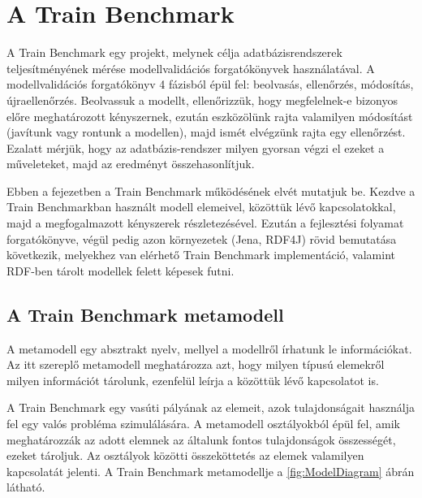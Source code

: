 \chapter{A Train Benchmark}

A Train Benchmark\cite{Szárnyas2017} egy projekt, melynek célja adatbázisrendszerek teljesítményének mérése modellvalidációs forgatókönyvek használatával. A modellvalidációs forgatókönyv 4 fázisból épül fel: beolvasás, ellenőrzés, módosítás, újraellenőrzés. Beolvassuk a modellt, ellenőrizzük, hogy megfelelnek-e bizonyos előre meghatározott kényszernek, ezután eszközölünk rajta valamilyen módosítást (javítunk vagy rontunk a modellen), majd ismét elvégzünk rajta egy ellenőrzést. Ezalatt mérjük, hogy az adatbázis-rendszer milyen gyorsan végzi el ezeket a műveleteket, majd az eredményt összehasonlítjuk.

Ebben a fejezetben a Train Benchmark működésének elvét mutatjuk be. Kezdve a Train Benchmarkban használt modell elemeivel, közöttük lévő kapcsolatokkal, majd a megfogalmazott kényszerek részletezésével. Ezután a fejlesztési folyamat forgatókönyve, végül pedig azon környezetek (Jena, RDF4J) rövid bemutatása következik, melyekhez van elérhető Train Benchmark implementáció, valamint RDF\cite{Wood:14:RCA}-ben tárolt modellek felett képesek futni.

\section{A Train Benchmark metamodell}

A metamodell egy absztrakt nyelv, mellyel a modellről írhatunk le információkat.\cite{pickametamodeling} Az itt szereplő metamodell meghatározza azt, hogy milyen típusú elemekről milyen információt tárolunk, ezenfelül leírja a közöttük lévő kapcsolatot is.

A Train Benchmark egy vasúti pályának az elemeit, azok tulajdonságait használja fel egy valós probléma szimulálására. A metamodell osztályokból épül fel, amik meghatározzák az adott elemnek az általunk fontos tulajdonságok összességét, ezeket tároljuk. Az osztályok közötti összeköttetés az elemek valamilyen kapcsolatát jelenti. A Train Benchmark metamodellje a \ref{fig:ModelDiagram} ábrán látható.

